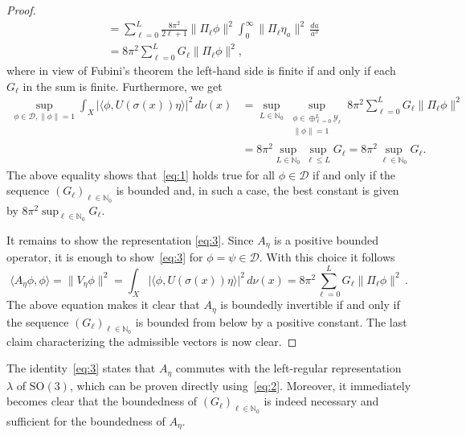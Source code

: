 \documentclass[a4paper,11pt,DIV=11,%
abstract=on%
]{scrartcl}
\def\SO{{\mathrm{SO}}}
\def\N{{\mathbb N}}
\newcommand{\red}[1]{#1}
\newcommand{\blue}[1]{#1}
\begin{document}
\begin{proof}
\begin{align}
		&= \sum_{\ell=0}^L \frac{8\pi^2}{2\ell+1}
		\bigl\lVert \Pi_{\ell}\phi\bigr\rVert^2
		\int_0^\infty \bigl\lVert\Pi_{\ell}\eta_a\bigr\rVert^2 \,\frac{da}{a^3} \label{heavy_change}\\
		&= 8\pi^2\sum_{\ell=0}^L G_\ell \bigl\lVert\Pi_{\ell}\phi\bigr\rVert^2,
	\end{align}
	where in view of Fubini's theorem the left-hand side is finite if and only if each
	$G_\ell$ in the sum is finite. Furthermore, we get
	\begin{align*}
		\sup_{\phi\in\mathcal D,\lVert\phi\rVert=1}
		\int_X\bigl|\bigl\langle\phi,U(\sigma(x))\eta\bigr\rangle\bigr|^2\,d\nu(x)
		&= \sup_{L\in\N_0} \sup_{ \substack{\phi\in \oplus_{\ell=0}^L \mathcal Y_\ell\\
				\lVert\phi\rVert=1}} 8\pi^2\sum_{\ell=0}^L G_\ell
		\bigl\lVert \Pi_{\ell}\phi \bigr\rVert^2 \\
		& = 8\pi^2 \sup_{L\in\N_0} \sup_{\ell\leq L} G_\ell
		= 8\pi^2 \sup_{\ell\in\N_0} G_\ell.
	\end{align*}
	The above equality shows that~\eqref{eq:1} holds true for all $\phi\in\mathcal D$
	if and only if the sequence $(G_\ell)_{\ell\in\N_0} $ is bounded and,
	in such a case,  the best constant is  given by $8\pi^2\sup_{\ell\in\N_0}G_\ell$.
	
	It remains to show the representation \eqref{eq:3}. Since $A_\eta$ is a positive bounded
	operator, it is enough to show~\eqref{eq:3} for \red{$\phi=\psi\in\mathcal D$}. With this choice it follows
	\[
	\langle A_\eta \phi,\phi\rangle
	= \lVert V_\eta\phi\rVert^2
	=\int_X\bigl|\bigl\langle\phi,U(\sigma(x))\eta\bigr\rangle\bigr|^2\,d\nu(x)
	= 8\pi^2\sum_{\ell=0}^L G_\ell \bigl\lVert \Pi_{\ell}\phi \bigr\rVert^2 \,.
	\]
\red{The above equation makes it clear that $A_\eta$ is boundedly
  invertible if and only if the sequence $(G_\ell)_{\ell\in\N_0}$ is
  bounded from below by a positive constant. The last claim
characterizing the admissible vectors is now clear. }
\end{proof}

The identity~\eqref{eq:3} states that $A_\eta$ commutes with the left-regular representation
$\lambda$ of $\SO(3)$, which can be \blue{proven directly} using~\eqref{eq:2}. Moreover, it
immediately becomes clear that the boundedness of $(G_\ell)_{\ell\in \N_0}$ is indeed
necessary and sufficient for the boundedness of $A_\eta$.
\end{document}
